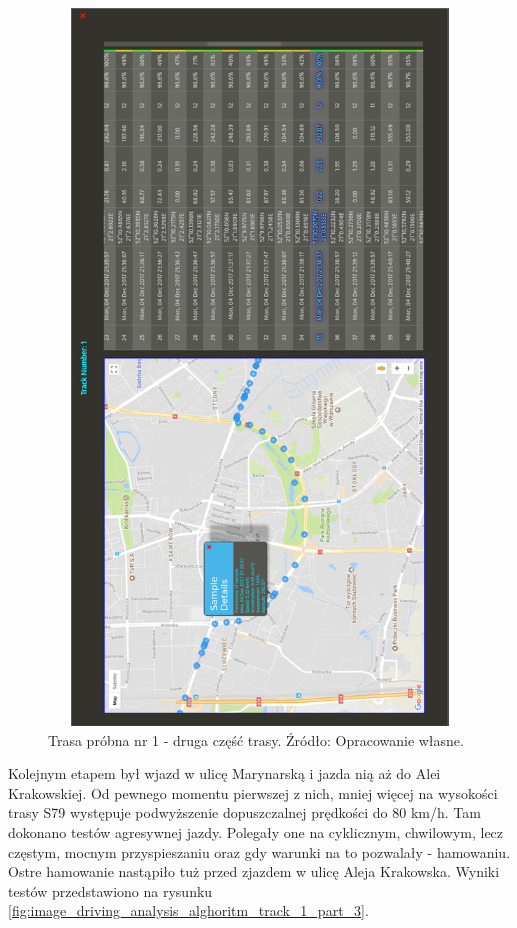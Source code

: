 \begin{figure}[H]
	\centering
	\includegraphics[height=19cm, width=13cm]{img/driving_analysis/test_track_part_2.png}
	\caption{Trasa próbna nr 1 - druga część trasy. Źródło: Opracowanie własne.}
	\label{fig:image_driving_analysis_alghoritm_track_1_part_2}
\end{figure}

Kolejnym etapem był wjazd w ulicę Marynarską i jazda nią aż do Alei Krakowskiej. Od pewnego momentu pierwszej z nich, mniej więcej na wysokości trasy S79 występuje podwyższenie dopuszczalnej prędkości do 80 km/h. Tam dokonano testów agresywnej jazdy. Polegały one na cyklicznym, chwilowym, lecz częstym, mocnym przyspieszaniu oraz gdy warunki na to pozwalały - hamowaniu. Ostre hamowanie nastąpiło tuż przed zjazdem w ulicę Aleja Krakowska. Wyniki testów przedstawiono na rysunku \ref{fig:image_driving_analysis_alghoritm_track_1_part_3}.

